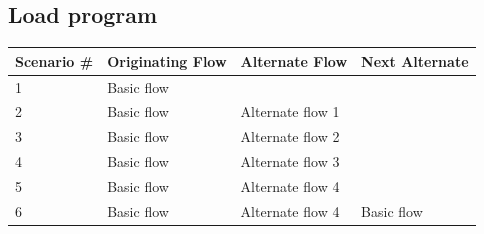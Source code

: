 \documentclass[12pt]{article}
\begin{document}
\subsection{Load program}

\begin{table}[h!]
  \begin{tabular}{l | l | l | l}
    \textbf{Scenario \#} &
    \textbf{Originating Flow} &
    \textbf{Alternate Flow} &
    \textbf{Next Alternate} \\ \hline

    1 &
    Basic flow &
    &
    \\ \hline

    2 &
    Basic flow &
    Alternate flow 1 &
    \\ \hline

    3 &
    Basic flow &
    Alternate flow 2 &
    \\ \hline

    4 &
    Basic flow &
    Alternate flow 3 &
    \\ \hline

    5 &
    Basic flow &
    Alternate flow 4 &
    \\ \hline

    6 &
    Basic flow &
    Alternate flow 4 &
    Basic flow \\ \hline

  \end{tabular}
\end{table}
\end{document}
